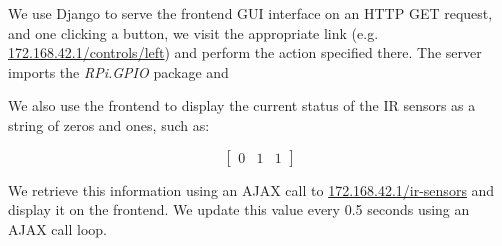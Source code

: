 \begin{enumerate}
		We use Django to serve the frontend GUI interface on an HTTP GET request, and one clicking a button, we visit the appropriate link (e.g. \url{172.168.42.1/controls/left}) and perform the action specified there. The server imports the \textit{RPi.GPIO} package and 
		
		We also use the frontend to display the current status of the IR sensors as a string of zeros and ones, such as:
		
		\begin{equation}
			\begin{bmatrix}
			0 & 1 & 1
			\end{bmatrix}
		\end{equation}
		
		
		We retrieve this information using an AJAX call to \url{172.168.42.1/ir-sensors} and display it on the frontend. We update this value every 0.5 seconds using an AJAX call loop. 
		
	\end{enumerate}
	
	
